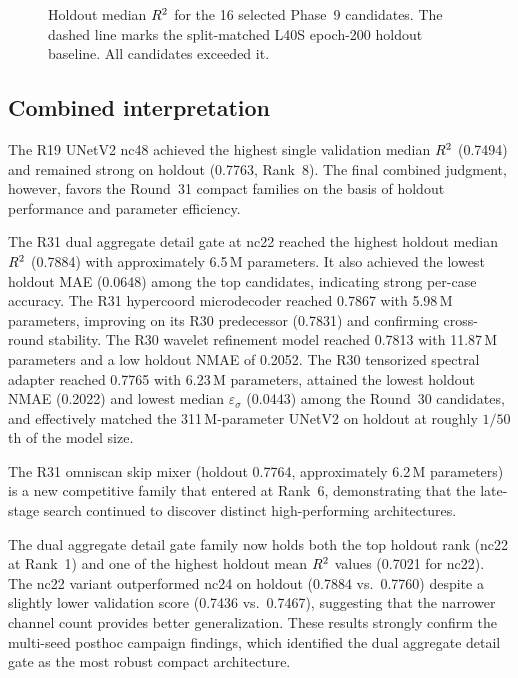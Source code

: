 ﻿\documentclass[preprint,12pt,authoryear]{elsarticle}
\newcommand{\rTwo}{R\textsuperscript{2}}
\begin{document}
\begin{figure}[p]
\centering
{}
\caption{Holdout median $\rTwo{}$ for the 16 selected Phase~9 candidates. The dashed line marks the split-matched L40S epoch-200 holdout baseline. All candidates exceeded it.}
\label{fig:holdoutbar}
\end{figure}

\subsection{Combined interpretation}
\label{sec:combined}

The R19 UNetV2 nc48 achieved the highest single validation median $\rTwo{}$ (0.7494) and remained strong on holdout (0.7763, Rank~8).
The final combined judgment, however, favors the Round~31 compact families on the basis of holdout performance and parameter efficiency.

The R31 dual aggregate detail gate at nc22 reached the highest holdout median $\rTwo{}$ (0.7884) with approximately 6.5\,M parameters.
It also achieved the lowest holdout MAE (0.0648) among the top candidates, indicating strong per-case accuracy.
The R31 hypercoord microdecoder reached 0.7867 with 5.98\,M parameters, improving on its R30 predecessor (0.7831) and confirming cross-round stability.
The R30 wavelet refinement model reached 0.7813 with 11.87\,M parameters and a low holdout NMAE of 0.2052.
The R30 tensorized spectral adapter reached 0.7765 with 6.23\,M parameters, attained the lowest holdout NMAE (0.2022) and lowest median $\varepsilon_{\sigma}$ (0.0443) among the Round~30 candidates, and effectively matched the 311\,M-parameter UNetV2 on holdout at roughly $1/50$th of the model size.

The R31 omniscan skip mixer (holdout 0.7764, approximately 6.2\,M parameters) is a new competitive family that entered at Rank~6, demonstrating that the late-stage search continued to discover distinct high-performing architectures.

The dual aggregate detail gate family now holds both the top holdout rank (nc22 at Rank~1) and one of the highest holdout mean $\rTwo{}$ values (0.7021 for nc22).
The nc22 variant outperformed nc24 on holdout (0.7884 vs.\ 0.7760) despite a slightly lower validation score (0.7436 vs.\ 0.7467), suggesting that the narrower channel count provides better generalization.
These results strongly confirm the multi-seed posthoc campaign findings, which identified the dual aggregate detail gate as the most robust compact architecture.
\end{document}
